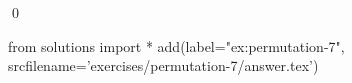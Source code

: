 
\begin{ex} 
  \label{ex:permutation-7}
  
  \qed
\end{ex} 
\begin{python0}
from solutions import *
add(label="ex:permutation-7",
    srcfilename='exercises/permutation-7/answer.tex') 
\end{python0}
